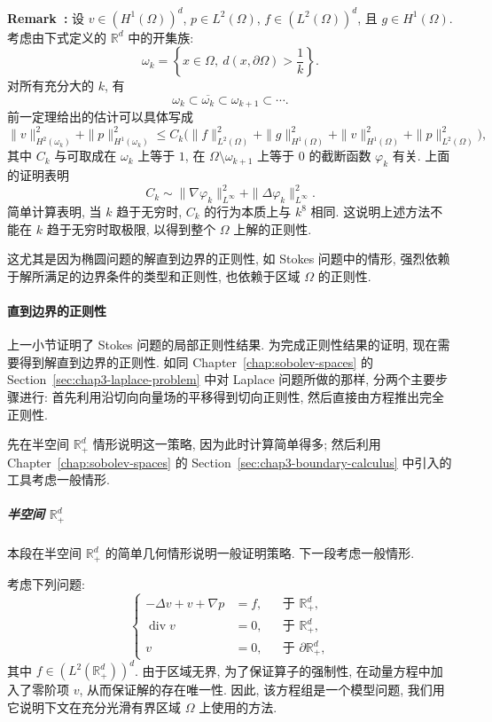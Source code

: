 \par\noindent{}\textbf{Remark~\thechapterfoursectionsixremark:}\label{rem:chap4-stokes-local-exhaustion}\quad
设 $v\in(H^1(\Omega))^d$, $p\in L^2(\Omega)$, $f\in(L^2(\Omega))^d$, 且 $g\in H^1(\Omega)$. 考虑由下式定义的 $\mathbb R^d$ 中的开集族:
\[
 \omega_k=\left\{x\in\Omega,\ d(x,\partial\Omega)>\frac1k\right\}.
\]
对所有充分大的 $k$, 有
\[
 \omega_k\subset\overline{\omega_k}\subset\omega_{k+1}\subset\cdots.
\]
前一定理给出的估计可以具体写成
\[
 \|v\|_{H^2(\omega_k)}^2+\|p\|_{H^1(\omega_k)}^2
 \leq C_k\bigl(\|f\|_{L^2(\Omega)}^2+\|g\|_{H^1(\Omega)}^2
 +\|v\|_{H^1(\Omega)}^2+\|p\|_{L^2(\Omega)}^2\bigr),
\]
其中 $C_k$ 与可取成在 $\omega_k$ 上等于 $1$, 在 $\Omega\setminus\omega_{k+1}$ 上等于 $0$ 的截断函数 $\varphi_k$ 有关. 上面的证明表明
\[
 C_k\sim\|\nabla\varphi_k\|_{L^\infty}^2+\|\Delta\varphi_k\|_{L^\infty}^2.
\]
简单计算表明, 当 $k$ 趋于无穷时, $C_k$ 的行为本质上与 $k^8$ 相同. 这说明上述方法不能在 $k$ 趋于无穷时取极限, 以得到整个 $\Omega$ 上解的正则性.

这尤其是因为椭圆问题的解直到边界的正则性, 如 Stokes 问题中的情形, 强烈依赖于解所满足的边界条件的类型和正则性, 也依赖于区域 $\Omega$ 的正则性.


\paragraph{直到边界的正则性}
\label{subsubsec:chap4-stokes-boundary-regularity}

上一小节证明了 Stokes 问题的局部正则性结果. 为完成正则性结果的证明, 现在需要得到解直到边界的正则性. 如同 Chapter~\ref{chap:sobolev-spaces} 的 Section~\ref{sec:chap3-laplace-problem} 中对 Laplace 问题所做的那样, 分两个主要步骤进行: 首先利用沿切向向量场的平移得到切向正则性, 然后直接由方程推出完全正则性.

先在半空间 $\mathbb R_+^d$ 情形说明这一策略, 因为此时计算简单得多; 然后利用 Chapter~\ref{chap:sobolev-spaces} 的 Section~\ref{sec:chap3-boundary-calculus} 中引入的工具考虑一般情形.

\subparagraph{半空间 $\mathbb R_+^d$}
\label{subsubsec:chap4-stokes-half-space}
\leavevmode\par

本段在半空间 $\mathbb R_+^d$ 的简单几何情形说明一般证明策略. 下一段考虑一般情形.

考虑下列问题:
\begin{equation}
 \left\{
 \begin{aligned}
  -\Delta v+v+\nabla p&=f,&&\text{于 }\mathbb R_+^d,\\
  \operatorname{div}v&=0,&&\text{于 }\mathbb R_+^d,\\
  v&=0,&&\text{于 }\partial\mathbb R_+^d,
 \end{aligned}
 \right.
 \label{eq:chap4-half-space-stokes}
\end{equation}
其中 $f\in(L^2(\mathbb R_+^d))^d$. 由于区域无界, 为了保证算子的强制性, 在动量方程中加入了零阶项 $v$, 从而保证解的存在唯一性. 因此, 该方程组是一个模型问题, 我们用它说明下文在充分光滑有界区域 $\Omega$ 上使用的方法.

